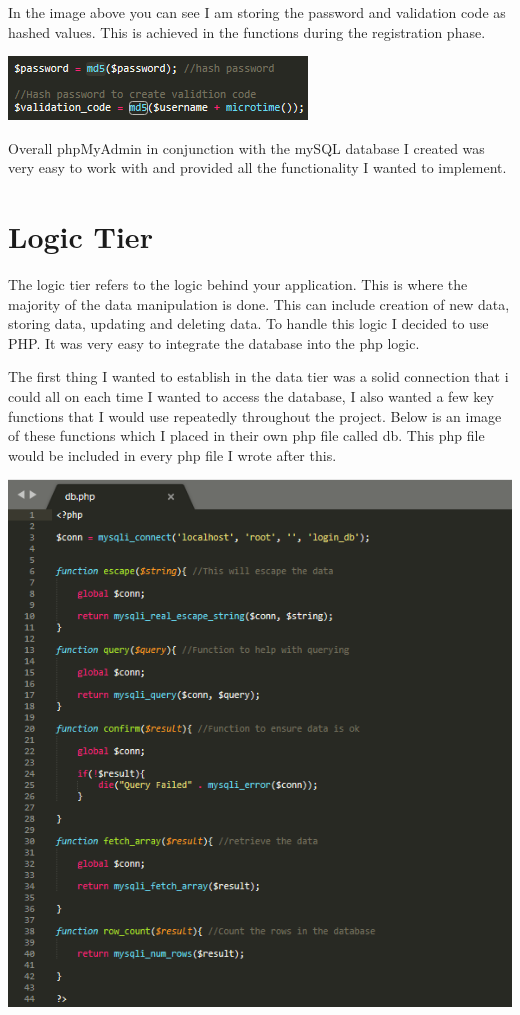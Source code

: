 In the image above you can see I am storing the password and validation code as hashed values.
This is achieved in the functions during the registration phase.

\includegraphics[width=\textwidth,height=\textheight,keepaspectratio]{img/hash.png}

Overall phpMyAdmin in conjunction with the mySQL database I created was very easy to work with and provided all the functionality I wanted to implement.

\section{Logic Tier}
The logic tier refers to the logic behind your application. This is where the majority of the data manipulation is done. This can include creation of new data, storing data, updating and deleting data. To handle this logic I decided to use PHP. It was very easy to integrate the database into the php logic. 

The first thing I wanted to establish in the data tier was a solid connection that i could all on each time I wanted to access the database, I also wanted a few key functions that I would use repeatedly throughout the project. Below is an image of these functions which I placed in their own php file called db. This php file would be included in every php file I wrote after this.

\includegraphics[width=\textwidth,height=\textheight,keepaspectratio]{img/db.png}

